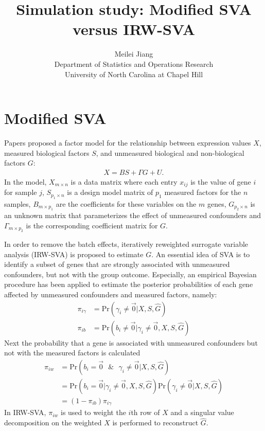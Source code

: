 \documentclass[11pt]{article}
\begin{document}
\author{Meilei Jiang\\
    Department of Statistics and Operations Research\\
		University of North Carolina at Chapel Hill}
\title{Simulation study: Modified SVA versus IRW-SVA}

\maketitle
\section{Modified SVA}
Papers \cite{leek2012sva, leek2007capturing, leek2008general} proposed a factor model for the relationship between expression values $X$, measured biological factors $S$, and unmeasured biological and non-biological factors $G$:
$$ \begin{aligned}
X = B S + \Gamma G + U.
\end{aligned}$$
In the model, $X_{m \times n}$ is a data matrix where each entry $x_{ij}$ is the value of gene $i$ for sample $j$, $S_{p_1 \times n}$ is a design model matrix of $p_1$ measured factors for the $n$ samples, $B_{m \times p_1}$ are the coefficients for these variables on the $m$ genes, $G_{p_2 \times n}$ is an unknown matrix that parameterizes the effect of unmeasured confounders and $\Gamma_{m \times p_2}$ is the corresponding coefficient matrix for $G$.

In order to remove the batch effects, iteratively reweighted surrogate variable analysis (IRW-SVA) is proposed to estimate $G$. An essential idea of SVA is to identify a subset of genes that are strongly associated with unmeasured confounders, but not with the group outcome. Especially, an empirical Bayesian procedure has been applied to estimate the posterior probabilities of each gene affected by unmeasured confounders and measured factors, namely: 
$$\begin{aligned}
\pi_{i\gamma} &= \text{Pr}( \gamma_i \neq \vec{0}| X, S, \hat{G}) \\
\pi_{i b} &= \text{Pr}(b_i \neq \vec{0} | \gamma_i \neq \vec{0}, X, S, \hat{G}) 
\end{aligned}$$
Next the probability that a gene is associated with unmeasured confounders but not with the measured factors is calculated
$$\begin{aligned}
\pi_{i w} &= \text{Pr}(b_i = \vec{0} \text{ } \& \text{ } \gamma_i \neq \vec{0} | X, S, \hat{G}) \\
&= \text{Pr}(b_i = \vec{0} | \gamma_i \neq \vec{0}, X, S, \hat{G}) \text{Pr}( \gamma_i \neq \vec{0}| X, S, \hat{G}) \\
&= (1 - \pi_{i b})\pi_{i\gamma}                     
\end{aligned}$$
In IRW-SVA, $\pi_{i w}$ is used to weight the $i$th row of $X$ and a singular value decomposition on the weighted $X$ is performed to reconstruct $\hat{G}$.
\end{document}
